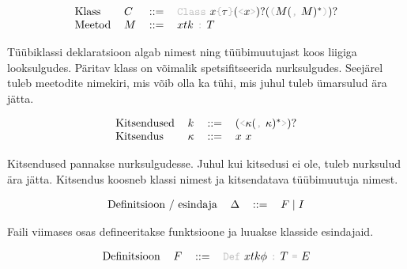 \documentclass[12pt]{article}
\begin{document}
    \begin{equation*}
      \begin{tabular}{llll}
        Klass  & $C$ & $::=$ & {\color{helehall}\verb!Class!} $x${\color{helehall}\verb!{!}$\tau${\color{helehall}\verb!}!}$(${\color{helehall}\verb!<!}$x${\color{helehall}\verb!>!}$)?(${\color{helehall}\verb!(!}$M(${\color{helehall}\verb!,!} $M)^*${\color{helehall}\verb!)!}$)?$ \\
        Meetod & $M$ & $::=$ & $xtk$ {\color{helehall}\verb!:!} $T$
      \end{tabular}
    \end{equation*}

    Tüübiklassi deklaratsioon algab nimest ning tüübimuutujast koos liigiga looksulgudes. Päritav klass on võimalik spetsifitseerida nurksulgudes. Seejärel tuleb meetodite nimekiri, mis võib olla ka tühi, mis juhul tuleb ümarsulud ära jätta.

    \begin{equation*}
      \begin{tabular}{llll}
        Kitsendused & $k$      & $::=$ & $(${\color{helehall}\verb!<!}$\kappa(${\color{helehall}\verb!,!} $\kappa)^*${\color{helehall}\verb!>!}$)?$ \\
        Kitsendus   & $\kappa$ & $::=$ & $x$ $x$
      \end{tabular}
    \end{equation*}

    Kitsendused pannakse nurksulgudesse. Juhul kui kitsedusi ei ole, tuleb nurksulud ära jätta. Kitsendus koosneb klassi nimest ja kitsendatava tüübimuutuja nimest.

    \begin{equation*}
      \begin{tabular}{llll}
        Definitsioon / esindaja & $\Delta$ & $::=$ & $F\mid I$
      \end{tabular}
    \end{equation*}

    Faili viimases osas defineeritakse funktsioone ja luuakse klasside esindajaid.

    \begin{equation*}
      \begin{tabular}{llll}
        Definitsioon & $F$ & $::=$ & {\color{helehall}\verb!Def!} $xtk\phi$ {\color{helehall}\verb!:!} $T$ {\color{helehall}\verb!=!} $E$
      \end{tabular}
    \end{equation*}
\end{document}

